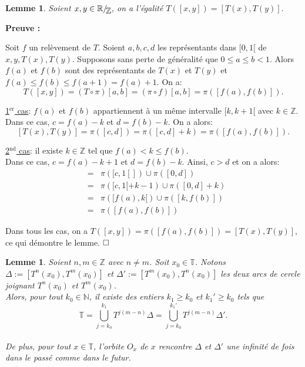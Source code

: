 \documentclass[11pt,a4 paper]{article}
\newtheorem{lemme}[theoreme]{Lemme}
\newcommand{\Tbb}{\mathbb{T}}
\newcommand{\Rbb}{\mathbb{R}}
\newcommand{\Zbb}{\mathbb{Z}}
\newcommand{\Nbb}{\mathbb{N}}
\newcommand*{\EnsembleQuotient}[2]%
{\ensuremath{%
		#1/\!\raisebox{-.65ex}{\ensuremath{\mathcal{#2}}}}}
\newenvironment{lm}{\begin{box_lm}\begin{lemme}}{\end{lemme}\end{box_lm}}
\begin{document}
\vspace{3mm}



\begin{lm}\label{T[x;y]}
	Soient  $x,y \in \EnsembleQuotient{\Rbb}{\Zbb}$, on a l'égalité $T([x,y])=[T(x),T(y)].$
\end{lm}
	
	\textbf{Preuve :}
	\par Soit $f$ un relèvement de $T$. Soient $a, b, c, d$ les représentants dans $[0,1[$ de $x,y,T(x),T(y)$. Supposons sans perte de généralité que $0\leq a\leq b <1$. Alors $f(a)$ et $f(b)$ sont des représentants de $T(x)$ et $T(y)$ et $f(a)\leq f(b) \leq f(a+1)=f(a)+1$. On a:
		$$T([x,y])=(T\circ\pi)[a,b]=(\pi\circ f)[a,b]=\pi([f(a),f(b)]).$$
	
	\par \underline{1$^{\mathrm{er}}$ cas}: $f(a)$ et $f(b)$ appartiennent à un même intervalle $[k,k+1[$ avec $k \in \Zbb$.\\
	Dans ce cas, $c=f(a)-k$ et $d=f(b)-k$. On a alors:
	$$[T(x),T(y)]=\pi([c,d])=\pi([c,d]+k)=\pi([f(a),f(b)]).$$
	
	\par \underline{2$^{\mathrm{nd}}$ cas}: il existe $k \in \Zbb$ tel que $f(a)<k\leq f(b)$.\\
	Dans ce cas, $c=f(a)-k+1$ et $d=f(b)-k$. Ainsi, $c>d$ et on a alors:
	\begin{eqnarray*}
			[T(x),T(y)]&=&\pi([c,1[])\cup\pi([0,d])\\
			&=&\pi([c,1[+k-1)\cup\pi([0,d]+k)\\
			&=&\pi([f(a),k[)\cup\pi([k,f(b)])\\
			&=&\pi([f(a),f(b)])
	\end{eqnarray*}

	\par Dans tous les cas, on a $T([x,y])=\pi([f(a),f(b)])=[T(x),T(y)]$, ce qui démontre le lemme. $\hfill \square$\\
	
		
















\begin{lm}\label{delta orbite}
	Soient $n,m \in \mathbb{Z}$ avec $n\neq m$. Soit $x_0 \in \Tbb$. Notons $\Delta := [T^n(x_0),T^m(x_0)]$ et $\Delta':=[T^m(x_0),T^n(x_0)]$ les deux arcs de cercle joignant $T^n(x_0)$ et $T^m(x_0)$.\\ Alors, pour tout $k_0 \in \Nbb$, il existe des entiers $k_1\geq k_0$ et $k_1'\geq k_0$ tels que $$\Tbb=\overset{k_1}{\underset{j=k_0}{\bigcup}}T^{j(m-n)}\Delta=\overset{k_1'}{\underset{j=k_0}{\bigcup}}T^{j(m-n)}\Delta'.$$ \\De plus, pour tout $x \in \Tbb$, l'orbite $O_x$ de $x$ rencontre $\Delta$ et $\Delta'$ une infinité de fois dans le passé comme dans le futur.
\end{lm}
\end{document}
